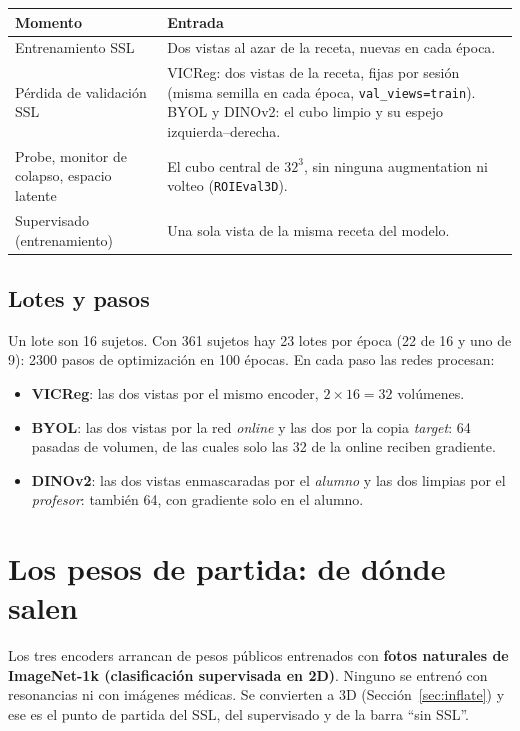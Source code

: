 \documentclass[11pt,a4paper]{article}
\begin{document}
\begin{table}[H]
\centering
\small
\begin{tabularx}{\textwidth}{l>{\raggedright\arraybackslash}X}
\toprule
Momento & Entrada \\
\midrule
Entrenamiento SSL & Dos vistas al azar de la receta, nuevas en cada época. \\
Pérdida de validación SSL & VICReg: dos vistas de la receta, fijas por sesión (misma semilla en cada
  época, \texttt{val\_views=train}). BYOL y DINOv2: el cubo limpio y su espejo izquierda--derecha. \\
Probe, monitor de colapso, espacio latente & El cubo central de $32^3$, sin ninguna augmentation ni
  volteo (\texttt{ROIEval3D}). \\
Supervisado (entrenamiento) & Una sola vista de la misma receta del modelo. \\
\bottomrule
\end{tabularx}
\end{table}

\subsection{Lotes y pasos}

Un lote son 16 sujetos. Con 361 sujetos hay 23 lotes por época (22 de 16 y uno de 9): 2300 pasos de
optimización en 100 épocas. En cada paso las redes procesan:
\begin{itemize}
\item \textbf{VICReg}: las dos vistas por el mismo encoder, $2\times16 = 32$ volúmenes.
\item \textbf{BYOL}: las dos vistas por la red \emph{online} y las dos por la copia \emph{target}:
  64 pasadas de volumen, de las cuales solo las 32 de la online reciben gradiente.
\item \textbf{DINOv2}: las dos vistas enmascaradas por el \emph{alumno} y las dos limpias por el
  \emph{profesor}: también 64, con gradiente solo en el alumno.
\end{itemize}

\section{Los pesos de partida: de dónde salen}
\label{sec:weights}

\begin{tldrbox}
Los tres encoders arrancan de pesos públicos entrenados con \textbf{fotos naturales de ImageNet-1k
(clasificación supervisada en 2D)}. Ninguno se entrenó con resonancias ni con imágenes médicas. Se
convierten a 3D (Sección~\ref{sec:inflate}) y ese es el punto de partida del SSL, del supervisado y
de la barra ``sin SSL''.
\end{tldrbox}
\end{document}
